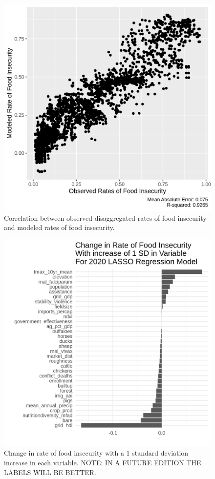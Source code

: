 \documentclass{article}
\begin{document}
\begin{figure}[H]
	\centering
	\includegraphics[width=0.6\linewidth]{../figures/Pred2020_Residuals.png}
	\caption{Correlation between observed disaggregated rates of food insecurity and modeled rates of food insecurity.}
	\label{fig:lasso_residuals}
\end{figure}
\begin{figure}[H]
	\centering
	\includegraphics[width=0.6\linewidth]{../figures/Pred2020_Coefs.png}
	\caption{Change in rate of food insecurity with a 1 standard deviation increase in each variable.  NOTE: IN A FUTURE EDITION THE LABELS WILL BE BETTER.}
	\label{fig:lasso_coefs}
\end{figure}
\end{document}
